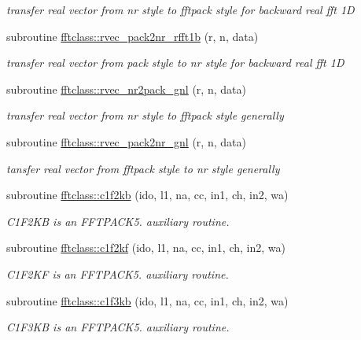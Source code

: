 \begin{DoxyCompactItemize}
\begin{DoxyCompactList}\small\item\em transfer real vector from nr style to fftpack style for backward real fft 1D \end{DoxyCompactList}\item 
subroutine \mbox{\hyperlink{namespacefftclass_a49a850047c36eff6fb6d5eb1669cb009}{fftclass\+::rvec\+\_\+pack2nr\+\_\+rfft1b}} (r, n, data)
\begin{DoxyCompactList}\small\item\em transfer real vector from pack style to nr style for backward real fft 1D \end{DoxyCompactList}\item 
subroutine \mbox{\hyperlink{namespacefftclass_a2c47e8aa546c8ea9f5f23219be52d57e}{fftclass\+::rvec\+\_\+nr2pack\+\_\+gnl}} (r, n, data)
\begin{DoxyCompactList}\small\item\em transfer real vector from nr style to fftpack style generally \end{DoxyCompactList}\item 
subroutine \mbox{\hyperlink{namespacefftclass_a5b968c02330134b7f60b0b19e3192e77}{fftclass\+::rvec\+\_\+pack2nr\+\_\+gnl}} (r, n, data)
\begin{DoxyCompactList}\small\item\em tansfer real vector from fftpack style to nr style generally \end{DoxyCompactList}\item 
subroutine \mbox{\hyperlink{namespacefftclass_a5b4381756639205cdda3aa66b4d3e98c}{fftclass\+::c1f2kb}} (ido, l1, na, cc, in1, ch, in2, wa)
\begin{DoxyCompactList}\small\item\em C1\+F2\+KB is an F\+F\+T\+P\+A\+C\+K5. auxiliary routine. \end{DoxyCompactList}\item 
subroutine \mbox{\hyperlink{namespacefftclass_a0535bb9fc14fda824be9053638cdfb2a}{fftclass\+::c1f2kf}} (ido, l1, na, cc, in1, ch, in2, wa)
\begin{DoxyCompactList}\small\item\em C1\+F2\+KF is an F\+F\+T\+P\+A\+C\+K5. auxiliary routine. \end{DoxyCompactList}\item 
subroutine \mbox{\hyperlink{namespacefftclass_af43eb54e0a7553e31585e67ad240b860}{fftclass\+::c1f3kb}} (ido, l1, na, cc, in1, ch, in2, wa)
\begin{DoxyCompactList}\small\item\em C1\+F3\+KB is an F\+F\+T\+P\+A\+C\+K5. auxiliary routine. \end{DoxyCompactList}\item 

\end{DoxyCompactItemize}
